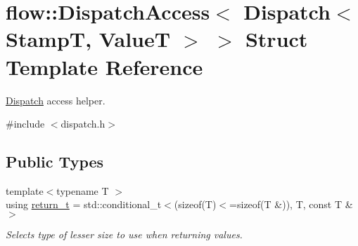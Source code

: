 \hypertarget{structflow_1_1_dispatch_access_3_01_dispatch_3_01_stamp_t_00_01_value_t_01_4_01_4}{}\section{flow\+:\+:Dispatch\+Access$<$ Dispatch$<$ StampT, ValueT $>$ $>$ Struct Template Reference}
\label{structflow_1_1_dispatch_access_3_01_dispatch_3_01_stamp_t_00_01_value_t_01_4_01_4}


\hyperlink{classflow_1_1_dispatch}{Dispatch} access helper.  




{\ttfamily \#include $<$dispatch.\+h$>$}

\subsection*{Public Types}
\begin{DoxyCompactItemize}
\item 
\mbox{\label{structflow_1_1_dispatch_access_3_01_dispatch_3_01_stamp_t_00_01_value_t_01_4_01_4_a36d7ab14d5fde88b9d255944db634f47}} 
{\footnotesize template$<$typename T $>$ }\\using \hyperlink{structflow_1_1_dispatch_access_3_01_dispatch_3_01_stamp_t_00_01_value_t_01_4_01_4_a36d7ab14d5fde88b9d255944db634f47}{return\+\_\+t} = std\+::conditional\+\_\+t$<$(sizeof(T)$<$=sizeof(T \&)), T, const T \& $>$
\begin{DoxyCompactList}\small\item\em Selects type of lesser size to use when returning values. \end{DoxyCompactList}\end{DoxyCompactItemize}
